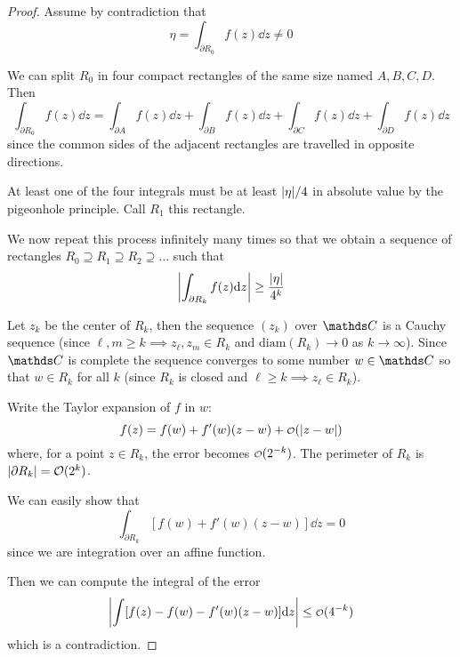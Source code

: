 \documentclass[12pt]{extarticle}
\numberwithin{equation}{subsection}
\begin{document}
\begin{proof}
	Assume by contradiction that
	\begin{equation}
		\eta = \int_{\partial R_0}^{} f(z) \dd z \neq 0
	\end{equation}

	We can split $R_0$ in four compact rectangles of the same size named $A, B, C, D$.
	Then
	\begin{equation}
		\int_{\partial R_0} f(z) \dd z =
		\int_{\partial A} f(z) \dd z +
		\int_{\partial B} f(z) \dd z +
		\int_{\partial C} f(z) \dd z
		+\int_{\partial D} f(z) \dd z
	\end{equation}
	since the common sides of the adjacent rectangles are travelled in opposite directions.

	At least one of the four integrals must be at least $\abs{\eta}/4$ in absolute value by the
	pigeonhole principle. Call $R_1$ this rectangle.

	We now repeat this process infinitely many times so that we obtain a sequence of rectangles
	$R_0 \supseteq R_1 \supseteq R_2 \supseteq \dots$ such that
	\begin{equation}
		\abs{\int_{\partial R_k}^{} f(z) \dd z} \geq \frac{\abs{\eta}}{4^k}
	\end{equation}

	Let $z_k$ be the center of $R_k$, then the sequence $(z_k)$ over $\C$ is a Cauchy sequence (since
	$\ell, m \geq k \implies z_\ell, z_m \in R_k$ and $\mathrm{diam}(R_k) \to 0$ as $k \to \infty$).
	Since $\C$ is complete the sequence converges to some number $w \in \C$ so that $w \in R_k$ for
	all $k$ (since $R_k$ is closed and $\ell \geq k \implies z_\ell \in R_k$).

	Write the Taylor expansion of $f$ in $w$:
	\begin{equation}
		f(z) = f(w) + f'(w)(z-w) + \o(\abs{z-w})
	\end{equation}
	where, for a point $z \in R_k$, the error becomes $\o(2^{-k})$.
	The perimeter of $R_k$ is $\abs{\partial R_k} = \mathcal{O}(2^{k})$.

	We can easily show that
	\begin{equation}
		\int_{\partial R_k}^{} [f(w) + f'(w)(z-w)] \dd z = 0
	\end{equation}
	since we are integration over an affine function.

	Then we can compute the integral of the error
	\begin{equation}
		\abs{\int [f(z) - f(w) - f'(w)(z-w)] \dd z} \leq \o(4^{-k})
	\end{equation}
	which is a contradiction.
\end{proof}
\end{document}

